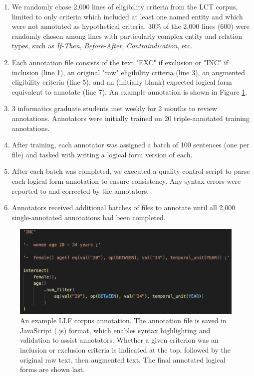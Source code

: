 \documentclass[../main.tex]{subfiles}
\begin{document}
\begin{enumerate}
    \item We randomly chose 2,000 lines of eligibility criteria from the LCT corpus, limited to only criteria which included at least one named entity and which were not annotated as hypothetical criteria. 30\% of the 2,000 lines (600) were randomly chosen among lines with particularly complex entity and relation types, such as \textit{If-Then}, \textit{Before-After}, \textit{Contraindication}, etc.
    \item  Each annotation file consists of the text "EXC" if exclusion or "INC" if inclusion (line 1), an original "raw" eligibility criteria (line 3), an augmented eligibility criteria (line 5), and an (initially blank) expected logical form equivalent to annotate (line 7). An example annotation is shown in Figure \ref{fig_annotation_example}.
    \item 3 informatics graduate students met weekly for 2 months to review annotations. Annotators were initially trained on 20 triple-annotated training annotations. 
    \item After training, each annotator was assigned a batch of 100 sentences (one per file) and tasked with writing a logical form version of each.
    \item After each batch was completed, we executed a quality control script to parse each logical form annotation to ensure consistency. Any syntax errors were reported to and corrected by the annotators.
    \item Annotators received additional batches of files to annotate until all 2,000 single-annotated annotations had been completed.
\end{enumerate}

\begin{figure}[h]
  \centering
  \includegraphics[scale=0.7]{Figures/llf/annotation_example.png}
  \caption{An example LLF corpus annotation. The annotation file is saved in JavaScript (.js) format, which enables syntax highlighting and validation to assist annotators. Whether a given criterion was an inclusion or exclusion criteria is indicated at the top, followed by the original raw text, then augmented text. The final annotated logical forms are shown last.}
  \label{fig_annotation_example}
\end{figure}
\end{document}
